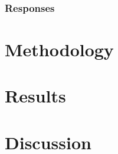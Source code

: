 \documentclass[12pt]{article}
\begin{document}
\subsubsection{Responses}

\section{Methodology} 

\section{Results}

\section{Discussion}

\medskip

\end{document}
